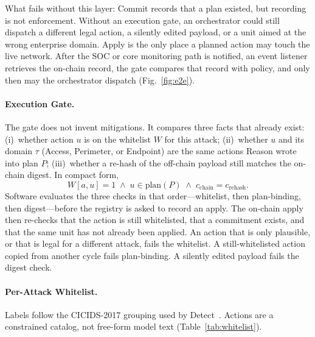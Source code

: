 What fails without this layer: Commit records that a plan existed, but recording is not enforcement. Without an execution gate, an orchestrator could still dispatch a different legal action, a silently edited payload, or a unit aimed at the wrong enterprise domain. Apply is the only place a planned action may touch the live network. After the SOC or core monitoring path is notified, an event listener retrieves the on-chain record, the gate compares that record with policy, and only then may the orchestrator dispatch (Fig.~\ref{fig:e2e}).

\paragraph{Execution Gate.}
The gate does not invent mitigations. It compares three facts that already exist: (i)~whether action $u$ is on the whitelist $W$ for this attack; (ii)~whether $u$ and its domain $\tau$ (Access, Perimeter, or Endpoint) are the same actions Reason wrote into plan $P$; (iii)~whether a re-hash of the off-chain payload still matches the on-chain digest. In compact form,
\begin{equation}
W[a,u]=1 \;\wedge\; u\in\mathrm{plan}(P) \;\wedge\; c_{\mathrm{chain}}=c_{\mathrm{rehash}}.
\label{eq:apply-gate}
\end{equation}
Software evaluates the three checks in that order---whitelist, then plan-binding, then digest---before the registry is asked to record an apply. The on-chain apply then re-checks that the action is still whitelisted, that a commitment exists, and that the same unit has not already been applied. An action that is only plausible, or that is legal for a different attack, fails the whitelist. A still-whitelisted action copied from another cycle fails plan-binding. A silently edited payload fails the digest check.

\paragraph{Per-Attack Whitelist.}
Labels follow the CICIDS-2017 grouping used by Detect~\cite{sharafaldin2018}. Actions are a constrained catalog, not free-form model text (Table~\ref{tab:whitelist}).

